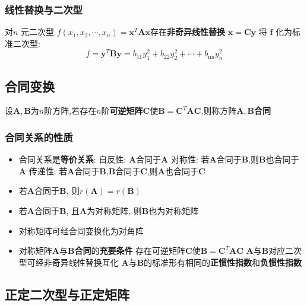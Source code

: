 \documentclass{article}
\begin{document}
			\subsubsection{线性替换与二次型}
				对$n$ 元二次型 $f\left(x_{1}, x_{2}, \cdots, x_{n}\right)=\boldsymbol{x}^{T} \boldsymbol{A} \boldsymbol{x}$存在\textbf{非奇异线性替换} $\boldsymbol{x}=\boldsymbol{C} \boldsymbol{y}$ 将 $\boldsymbol{f}$ 化为标准二次型:
				$$
				f=\boldsymbol{y}^{T} \boldsymbol{B} \boldsymbol{y}=b_{11} y_{1}^{2}+b_{22} y_{2}^{2}+\cdots+b_{\operatorname{nn}} y_{n}^{2}
				$$
		\subsection{合同变换}
			设$\boldsymbol A,\boldsymbol B$为$n$阶方阵,若存在$n$阶\textbf{可逆矩阵}$\boldsymbol C$使$\boldsymbol B=\boldsymbol C^T\boldsymbol A\boldsymbol C$,则称方阵$\boldsymbol A,\boldsymbol B$\textbf{合同}
			\subsubsection{合同关系的性质}
				\begin{itemize}
					\item 合同关系是\textbf{等价关系}:
						\subitem 自反性: $\boldsymbol A$合同于$\boldsymbol A$
						\subitem 对称性: 若$\boldsymbol A$合同于$\boldsymbol B$,则$\boldsymbol B$也合同于$\boldsymbol A$
						\subitem 传递性: 若$\boldsymbol A$合同于$\boldsymbol B$,$\boldsymbol B$合同于$\boldsymbol C$,则$\boldsymbol A$也合同于$\boldsymbol C$
					\item 若$\boldsymbol A$合同于$\boldsymbol B$, 则$r(\boldsymbol A)=r(\boldsymbol B)$
					\item 若$\boldsymbol A$合同于$\boldsymbol B$, 且$\boldsymbol A$为对称矩阵, 则$\boldsymbol B$也为对称矩阵
					\item 对称矩阵可经合同变换化为对角阵
					\item 对称矩阵$\boldsymbol A$与$\boldsymbol B$\textbf{合同}的\textbf{充要条件}
						\subitem 存在可逆矩阵$\boldsymbol C$使$\boldsymbol B=\boldsymbol C^T\boldsymbol A\boldsymbol C$
						\subitem $\boldsymbol A$与$\boldsymbol B$对应二次型可经非奇异线性替换互化
						\subitem $\boldsymbol A$与$\boldsymbol B$的标准形有相同的\textbf{正惯性指数}和\textbf{负惯性指数}
			\end{itemize}
		\subsection{正定二次型与正定矩阵}
\end{document}
